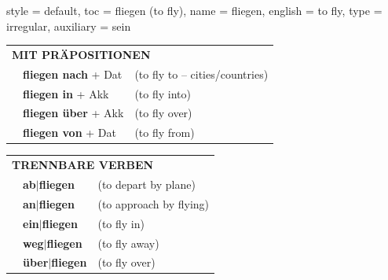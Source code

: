 \begin{verbentry}{
  style = {default},
  toc = {fliegen (to fly)},
  name = {fliegen},
  english = {to fly},
  type = {irregular},
  auxiliary = {sein}
}
   \vspace{10pt}

   \begin{tabular}{lll}
      \multicolumn{3}{l}{\textbf{MIT PRÄPOSITIONEN}}\\
& \textbf{fliegen nach} + Dat & (to fly to – cities/countries)\\
& \textbf{fliegen in} + Akk & (to fly into)\\
& \textbf{fliegen über} + Akk & (to fly over)\\
& \textbf{fliegen von} + Dat & (to fly from)\\
   \end{tabular}
  \hfill
   \begin{tabular}{lll}
      \multicolumn{3}{l}{\textbf{TRENNBARE VERBEN}}\\
 & \textbf{ab$|$fliegen} & (to depart by plane)\\
 & \textbf{an$|$fliegen} & (to approach by flying)\\
 & \textbf{ein$|$fliegen} & (to fly in)\\
 & \textbf{weg$|$fliegen} & (to fly away)\\
 & \textbf{über$|$fliegen} & (to fly over)\\
  \end{tabular}

\vspace{-5pt}
\end{verbentry}

